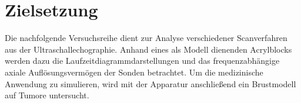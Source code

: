\section{Zielsetzung}
\label{sec:zielsetzung}

Die nachfolgende Versuchsreihe dient zur Analyse verschiedener Scanverfahren aus der Ultraschallechographie. Anhand eines als Modell dienenden
Acrylblocks werden dazu die Laufzeitdiagrammdarstellungen und das frequenzabhängige axiale Auflösungsvermögen der Sonden
betrachtet. Um die medizinische Anwendung zu simulieren, wird mit der Apparatur anschließend ein Brustmodell auf Tumore untersucht.

